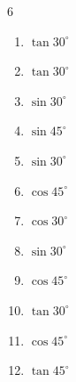\begin{multicols}{6}
\begin{enumerate}
  \item $\displaystyle \tan{30^\circ}$


  \item $\displaystyle \tan{30^\circ}$


  \item $\displaystyle \sin{30^\circ}$


  \item $\displaystyle \sin{45^\circ}$


  \item $\displaystyle \sin{30^\circ}$


  \item $\displaystyle \cos{45^\circ}$


  \item $\displaystyle \cos{30^\circ}$


\columnbreak %

  \item $\displaystyle \sin{30^\circ}$


  \item $\displaystyle \cos{45^\circ}$


  \item $\displaystyle \tan{30^\circ}$


  \item $\displaystyle \cos{45^\circ}$


  \item $\displaystyle \tan{45^\circ}$

        \phantom{$\displaystyle =1$}


\end{enumerate}
\end{multicols}
